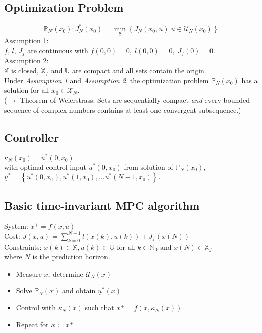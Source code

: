 \documentclass[english]{latex4ei/latex4ei_sheet}
\begin{document}
\begin{sectionbox}
\end{sectionbox}
\begin{sectionbox}

\subsection{Optimization Problem}
$$
\mathbb{P}_{N}\left(x_{0}\right): J_{N}^{*}\left(x_{0}\right)=\min _{\underline{u}}\left\{J_{N}\left(x_{0}, \underline{u}\right) | \underline{u} \in \mathcal{U}_{N}\left(x_{0}\right)\right\}
$$
Assumption 1:\\
$f,\,l,\,J_f$ are continuous with $f(0,0)=0,\; l(0,0)=0,\; J_f(0)=0$.\vspace{0.1cm}
\\
Assumption 2:\\
$\mathbb{X}$ is closed, $\mathbb{X}_f$ and $\mathbb{U}$ are compact and all sets contain the origin.\vspace{0.1cm}
\\
Under \textit{Assumption 1} and \textit{Assumption 2}, the optimization problem $\mathbb{P}_N(x_0)$ has a solution for all $x_0\in\mathcal{X}_N$. \\($\rightarrow$ Theorem of Weierstrass: Sets are sequentially compact \textit{and} every bounded sequence of complex numbers contains at least one convergent subsequence.)\\

\subsection{Controller}
$\kappa_{N}\left(x_{0}\right)=u^{*}\left(0, x_{0}\right)$ \\ 
with optimal control input $u^{*}\left(0, x_{0}\right)$ from solution of $\mathbb{P}_{N}\left(x_{0}\right)$, \\$\underline{u}^{*}=\left\{u^{*}\left(0, x_{0}\right), u^{*}\left(1, x_{0}\right), \ldots u^{*}\left(N-1, x_{0}\right)\right\}$.\\

\subsection{Basic time-invariant MPC algorithm}
System: $x^{+}=f(x, u)$\\ 
Cost: $J(x, \underline{u})=\sum\limits_{k=0}^{N-1} l(x(k), u(k))+J_{f}(x(N))$ \\
Constraints: $x(k) \in \mathbb{X}, u(k) \in \mathbb{U} \text { for all } k \in \mathbb{N}_{0} \text { and } x(N) \in \mathbb{X}_{f}$ \\
where $N$ is the prediction horizon.
\begin{itemize}
    \item Measure $x$, determine $\mathcal{U}_N(x)$
    \item Solve $\mathbb{P}_N(x)$ and obtain $\underline{u}^*(x)$
    \item Control with $\kappa_N(x)$ such that $x^+=f(x,\kappa_N(x))$
    \item Repeat for $x\coloneqq x^+$
\end{itemize}\vspace{0.2cm}


\end{sectionbox}
\end{document}
